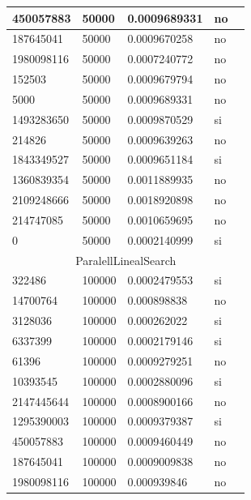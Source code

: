 \documentclass[12pt, fleqn]{article}                             %
\theoremstyle{break}                                            %
\begin{document}
\begin{longtable}{|m{5em}|m{5em}|m{10em}|m{5em}|@{}m{0pt}@{}}
            450057883& 50000  & 0.0009689331 & no &\\[1em]    \hline
            187645041& 50000  & 0.0009670258 & no &\\[1em]    \hline
            1980098116& 50000  & 0.0007240772 & no &\\[1em]    \hline
            152503& 50000  & 0.0009679794 & no &\\[1em]    \hline
            5000& 50000  & 0.0009689331 & no &\\[1em]    \hline
            1493283650& 50000  & 0.0009870529 & si &\\[1em]    \hline
            214826& 50000  & 0.0009639263 & no &\\[1em]    \hline
            1843349527& 50000  & 0.0009651184 & si &\\[1em]    \hline
            1360839354& 50000  & 0.0011889935 & no &\\[1em]    \hline
            2109248666& 50000  & 0.0018920898 & no &\\[1em]    \hline
            214747085& 50000  & 0.0010659695 & no &\\[1em]    \hline
            0& 50000  & 0.0002140999 & si &\\[1em]    \hline
            \multicolumn{5}{|c|}{ParalellLinealSearch}   \\          \hline
            322486& 100000  & 0.0002479553 & si &\\[1em]    \hline
            14700764& 100000  & 0.000898838 & no &\\[1em]    \hline
            3128036& 100000  & 0.000262022 & si &\\[1em]    \hline
            6337399& 100000  & 0.0002179146 & si &\\[1em]    \hline
            61396& 100000  & 0.0009279251 & no &\\[1em]    \hline
            10393545& 100000  & 0.0002880096 & si &\\[1em]    \hline
            2147445644& 100000  & 0.0008900166 & no &\\[1em]    \hline
            1295390003& 100000  & 0.0009379387 & si &\\[1em]    \hline
            450057883& 100000  & 0.0009460449 & no &\\[1em]    \hline
            187645041& 100000  & 0.0009009838 & no &\\[1em]    \hline
            1980098116& 100000  & 0.000939846 & no &\\[1em]    \hline

\end{longtable}
\end{document}
